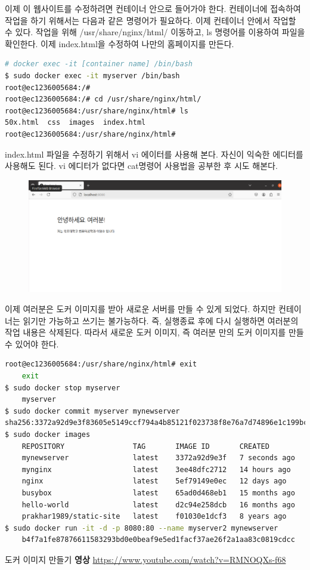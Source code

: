 이제 이 웹사이트를 수정하려면 컨테이너 안으로 들어가야 한다. 컨테이너에 접속하여 작업을 하기 위해서는 다음과 같은 명령어가 필요하다. 이제 컨테이너 안에서 작업할 수 있다. 작업을 위해 /usr/share/nginx/html/ 이동하고, ls 명령어를 이용하여 파일을 확인한다. 이제 index.html을 수정하여 나만의 홈페이지를 만든다. 
\begin{lstlisting}[language=bash]
# docker exec -it [container name] /bin/bash
$ sudo docker exec -it myserver /bin/bash
root@ec1236005684:/# 
root@ec1236005684:/# cd /usr/share/nginx/html/
root@ec1236005684:/usr/share/nginx/html# ls
50x.html  css  images  index.html
root@ec1236005684:/usr/share/nginx/html# 
\end{lstlisting}

index.html 파일을 수정하기 위해서 vi 에이터를 사용해 본다. 자신이 익숙한 에디터를 사용해도 된다. vi 에디터가 없다면 cat명령어 사용법을 공부한 후 시도 해본다. 

\begin{figure}[htp]
    \centering
    \includegraphics[width=\textwidth]{images/chaptert5images/image.png}
\end{figure}

이제 여러분은 도커 이미지를 받아 새로운 서버를 만들 수 있게 되었다. 하지만 컨테이너는 읽기만 가능하고 쓰기는 불가능하다. 즉, 실행종료 후에 다시 실행하면 여러분의 작업 내용은 삭제된다. 따라서 새로운 도커 이미지, 즉 여러분 만의 도커 이미지를 만들 수 있어야 한다. 

\begin{lstlisting}[language=bash]
root@ec1236005684:/usr/share/nginx/html# exit
    exit
$ sudo docker stop myserver 
    myserver
$ sudo docker commit myserver mynewserver
sha256:3372a92d9e3f83605e5149ccf794a4b85121f023738f8e76a7d74896e1c199bc
$ sudo docker images
    REPOSITORY                TAG       IMAGE ID       CREATED         SIZE
    mynewserver               latest    3372a92d9e3f   7 seconds ago   134MB
    mynginx                   latest    3ee48dfc2712   14 hours ago    249MB
    nginx                     latest    5ef79149e0ec   12 days ago     188MB
    busybox                   latest    65ad0d468eb1   15 months ago   4.26MB
    hello-world               latest    d2c94e258dcb   16 months ago   13.3kB
    prakhar1989/static-site   latest    f01030e1dcf3   8 years ago     134MB
$ sudo docker run -it -d -p 8080:80 --name myserver2 mynewserver
    b4f7a1fe87876611583293bd0e0beaf9e5ed1facf37ae26f2a1aa83c0819cdcc
\end{lstlisting}

\begin{KnowledgeBox}{도커 이미지 만들기}
    \textbf{영상}
\url{https://www.youtube.com/watch?v=RMNOQXs-f68}
\end{KnowledgeBox}